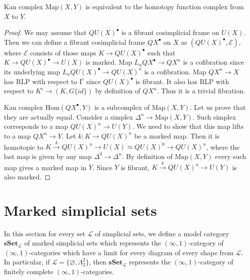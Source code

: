 \documentclass[reqno]{amsart}
\theoremstyle{definition}
\theoremstyle{remark}
\newcommand{\cat}[1]{\mathbf{#1}}
\newcommand{\sSet}{\cat{sSet}}
\newcommand{\Hom}{\mathrm{Hom}}
\newcommand{\Map}{\mathrm{Map}}
\newcommand{\I}{\mathrm{I}}
\numberwithin{figure}{section}
\begin{document}
\begin{lem}
Kan complex $\Map(X,Y)$ is equivalent to the homotopy function complex from $X$ to $Y$.
\end{lem}
\begin{proof}
We may assume that $QU(X)^\bullet$ is a fibrant cosimplicial frame on $U(X)$.
Then we can define a fibrant cosimplicial frame $QX^\bullet$ on $X$ as $(QU(X)^\bullet,\mathcal{E})$,
where $\mathcal{E}$ consists of those maps $K \to QU(X)^\bullet$ such that $K \to QU(X)^\bullet \to U(X)$ is marked.
Map $L_n QX^\bullet \to QX^n$ is a cofibration since its underlying map $L_n QU(X)^\bullet \to QU(X)^n$ is a cofibration.
Map $QX^n \to X$ has RLP with respect to $\I^\flat$ since $QU(X)^\bullet$ is fibrant.
It also has RLP with respect to $K^\flat \to (K, G \{id\})$ by definition of $QX^n$.
Thus it is a trivial fibration.

Kan complex $\Hom(QX^\bullet,Y)$ is a subcomplex of $\Map(X,Y)$.
Let us prove that they are actually equal.
Consider a simplex $\Delta^n \to \Map(X,Y)$.
Such simplex corresponds to a map $QU(X)^n \to U(Y)$.
We need to show that this map lifts to a map $QX^n \to Y$.
Let $k : K \to QU(X)^n$ be a marked map.
Then it is homotopic to $K \xrightarrow{k} QU(X)^n \to U(X) \simeq QU(X)^0 \to QU(X)^n$,
where the last map is given by any map $\Delta^0 \to \Delta^n$.
By definition of $\Map(X,Y)$ every such map gives a marked map in $Y$.
Since $Y$ is fibrant, $K \xrightarrow{k} QU(X)^n \to U(Y)$ is also marked.
\end{proof}

\section{Marked simplicial sets}

In this section for every set $\mathcal{L}$ of simplicial sets, we define a model category $\sSet_\mathcal{L}$ of marked simplicial sets
which represents the $(\infty,1)$-category of $(\infty,1)$-categories which have a limit for every diagram of every shape from $\mathcal{L}$.
In particular, if $\mathcal{L} = \{ \varnothing, \Lambda^2_2 \}$, then $\sSet_\mathcal{L}$ represents the $(\infty,1)$-category of finitely complete $(\infty,1)$-categories.
\end{document}
